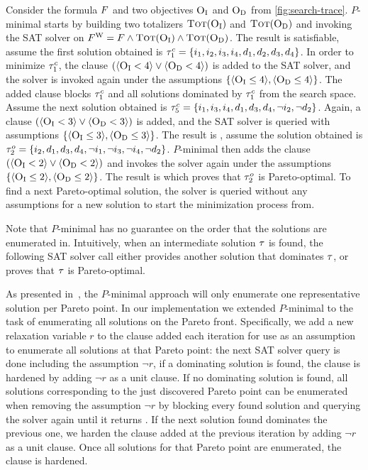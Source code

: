 \begin{example}\label{ex:pmin}
  Consider the formula $F$ and two objectives $\textsc{O}_{\text{I}}$ and $\textsc{O}_{\text{D}}$ from \cref{fig:search-trace}.
  $P$-minimal starts by building two totalizers $\textsc{Tot}(\textsc{O}_{\text{I}})$ and $\textsc{Tot}(\textsc{O}_{\text{D}})$ and invoking the SAT solver on $F^\text{W} = F \land \textsc{Tot}(\textsc{O}_{\text{I}}) \land \textsc{Tot}(\textsc{O}_{\text{D}})$.
  The result is satisfiable, assume the first solution obtained is $\tau^c_1 = \{i_1,\allowbreak i_2,\allowbreak i_3,\allowbreak i_4,\allowbreak d_1,\allowbreak d_2,\allowbreak d_3,\allowbreak d_4\}$. 
  In order to minimize $\tau^c_1$, the clause $(\langle \textsc{O}_{\text{I}} < 4 \rangle \lor \langle \textsc{O}_{\text{D}} < 4 \rangle)$ is added to the SAT solver, and the solver is invoked again under the assumptions $\{ \langle \textsc{O}_{\text{I}} \leq 4 \rangle, \langle \textsc{O}_{\text{D}} \leq 4 \rangle \}$.
  The added clause blocks $\tau^c_1$ and all solutions dominated by $\tau^c_1$ from the search space.
  Assume the next solution obtained is $\tau^c_5 = \{i_1,\allowbreak i_3,\allowbreak i_4,\allowbreak d_1,\allowbreak d_3,\allowbreak d_4,\allowbreak \lnot i_2,\allowbreak \lnot d_2\}$. 
  Again, a clause $(\langle \textsc{O}_{\text{I}} < 3 \rangle \lor \langle \textsc{O}_{\text{D}} < 3 \rangle)$ is added, and the SAT solver is queried with assumptions $\{ \langle \textsc{O}_{\text{I}} \leq 3 \rangle, \langle \textsc{O}_{\text{D}} \leq 3 \rangle \}$.
  The result is \sat{}, assume the solution obtained is $\tau^o_2 = \{i_2,\allowbreak d_1,\allowbreak d_3,\allowbreak d_4,\allowbreak \lnot i_1,\allowbreak \lnot i_3,\allowbreak \lnot i_4,\allowbreak \lnot d_2\}$. 
  $P$-minimal then adds the clause $(\langle \textsc{O}_{\text{I}} < 2 \rangle \lor \langle \textsc{O}_{\text{D}} < 2 \rangle)$ and invokes the solver again under the assumptions $\{ \langle \textsc{O}_{\text{I}} \leq 2 \rangle, \langle \textsc{O}_{\text{D}} \leq 2 \rangle \}$.
  The result is \unsat{} which proves that $\tau^o_2$ is Pareto-optimal. 
  To find a next Pareto-optimal solution, the solver is queried without any assumptions for a new solution to start the minimization process from.
\end{example}

Note that $P$-minimal has no guarantee on the order that the solutions are enumerated in. 
Intuitively, when an intermediate solution $\tau$ is found, the following SAT solver call either provides another solution that dominates $\tau$, or proves that $\tau$ is Pareto-optimal.  

As presented in~\cite{DBLP:conf/cp/SohBTB17}, the $P$-minimal approach will only enumerate one representative solution per Pareto point.
In our implementation we extended $P$-minimal to the task of enumerating all solutions on the Pareto front.
Specifically, we add a new relaxation variable $r$ to the clause added each iteration for use as an assumption to enumerate all solutions at that Pareto point:
the next SAT solver query is done including the assumption $\lnot r$, if a dominating solution is found, the clause is hardened by adding $\lnot r$ as a unit clause.
If no dominating solution is found, all solutions corresponding to the just discovered Pareto point can be enumerated when removing the assumption $\lnot r$ by blocking every found solution and querying the solver again until it returns \unsat{}.
If the next solution found dominates the previous one, we harden the clause added at the previous iteration by adding $\lnot r$ as a unit clause.
Once all solutions for that Pareto point are enumerated, the clause is hardened.

